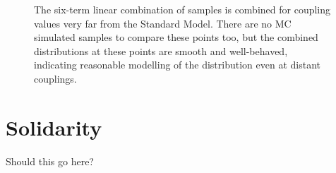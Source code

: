     \begin{figure}
    	\centering
        \caption{
            The six-term linear combination of samples is combined for coupling values very far from the Standard Model.
            There are no MC simulated samples to compare these points too, but the combined distributions at these points are smooth and well-behaved,
                indicating reasonable modelling of the distribution even at distant couplings.
        }
        \label{fig:vbf_hh_preview}
    \end{figure}


\section{Solidarity}
    
    Should this go here?
